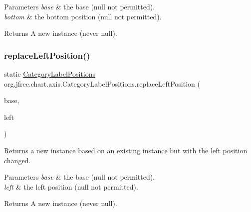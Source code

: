\begin{DoxyParams}{Parameters}
{\em base} & the base ({\ttfamily null} not permitted). \\
\hline
{\em bottom} & the bottom position ({\ttfamily null} not permitted).\\
\hline
\end{DoxyParams}
\begin{DoxyReturn}{Returns}
A new instance (never {\ttfamily null}). 
\end{DoxyReturn}
\mbox{\label{classorg_1_1jfree_1_1chart_1_1axis_1_1_category_label_positions_acce71ddd0f3c48f730178a798a0e721b}} 
\subsubsection{\texorpdfstring{replace\+Left\+Position()}{replaceLeftPosition()}}
{\footnotesize\ttfamily static \mbox{\hyperlink{classorg_1_1jfree_1_1chart_1_1axis_1_1_category_label_positions}{Category\+Label\+Positions}} org.\+jfree.\+chart.\+axis.\+Category\+Label\+Positions.\+replace\+Left\+Position (\begin{DoxyParamCaption}\item[{\mbox{\hyperlink{classorg_1_1jfree_1_1chart_1_1axis_1_1_category_label_positions}{Category\+Label\+Positions}}}]{base,  }\item[{\mbox{\hyperlink{classorg_1_1jfree_1_1chart_1_1axis_1_1_category_label_position}{Category\+Label\+Position}}}]{left }\end{DoxyParamCaption})\hspace{0.3cm}{\ttfamily [static]}}

Returns a new instance based on an existing instance but with the left position changed.


\begin{DoxyParams}{Parameters}
{\em base} & the base ({\ttfamily null} not permitted). \\
\hline
{\em left} & the left position ({\ttfamily null} not permitted).\\
\hline
\end{DoxyParams}
\begin{DoxyReturn}{Returns}
A new instance (never {\ttfamily null}). 
\end{DoxyReturn}
\mbox{\label{classorg_1_1jfree_1_1chart_1_1axis_1_1_category_label_positions_a6fd801801ccd30faa4db9b8a7ebded57}} 
